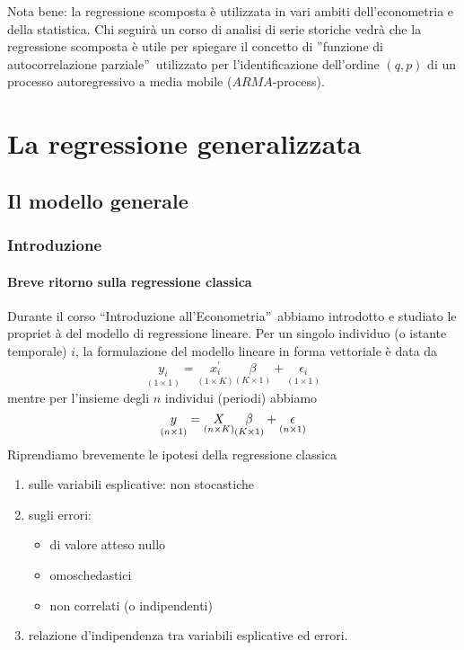 \documentclass[a4paper]{report}
\theoremstyle{remark}
\begin{document}
\noindent Nota bene: la regressione scomposta \`{e} utilizzata in vari
ambiti dell'econometria e della statistica. Chi seguir\`{a} un corso di
analisi di serie storiche vedr\`{a} che la regressione scomposta \`{e} utile
per spiegare il concetto di \textquotedblright funzione di autocorrelazione
parziale\textquotedblright\ utilizzato per l'identificazione dell'ordine $%
(q,p)$ di un processo autoregressivo a media mobile ($ARMA$-process).

\part{La regressione generalizzata}

\chapter{Il modello generale}

\section{Introduzione}

\subsection{Breve ritorno sulla regressione classica}

Durante il corso \textquotedblleft Introduzione
all'Econometria\textquotedblright\ abbiamo introdotto e studiato le propriet%
\`{a} del modello di regressione lineare. Per un singolo individuo (o
istante temporale) $i$, la formulazione del modello lineare in forma
vettoriale \`{e} data da 
\begin{equation}
\underset{(1\times 1)}{y_{i}}=\underset{(1\times K)}{x_{i}^{\prime }}%
\underset{(K\times 1)}{\beta }+\underset{(1\times 1)}{\epsilon _{i}}
\end{equation}%
mentre per l'insieme degli $n$ individui (periodi) abbiamo 
\begin{equation}
\underset{(n\times 1)}{y}=\underset{(n\times K)}{X}\underset{(K\times 1)}{%
\beta }+\underset{(n\times 1)}{\epsilon }
\end{equation}%
Riprendiamo brevemente le ipotesi della regressione classica

\begin{enumerate}
\item sulle variabili esplicative: non stocastiche

\item sugli errori:

\begin{itemize}
\item di valore atteso nullo

\item omoschedastici

\item non correlati (o indipendenti)
\end{itemize}

\item relazione d'indipendenza tra variabili esplicative ed errori.
\end{enumerate}
\end{document}
